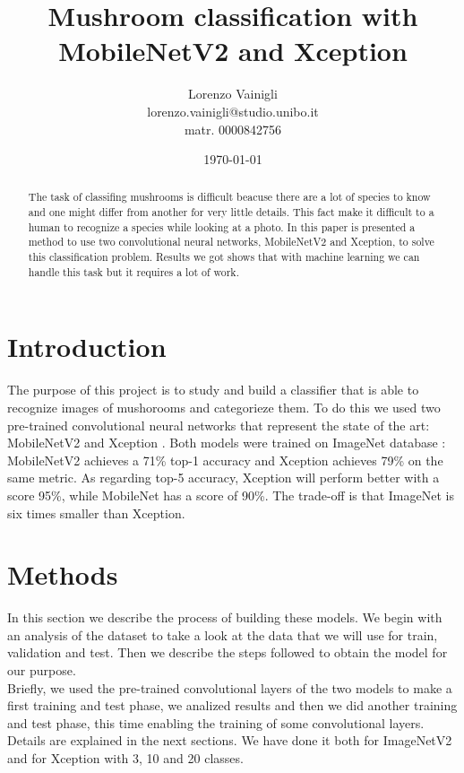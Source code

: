 \documentclass[12pt]{llncs}
\title{Mushroom classification with MobileNetV2 and Xception}
\author{Lorenzo Vainigli \\
lorenzo.vainigli@studio.unibo.it \\
matr. 0000842756}
\institute{Course of Machine Learning \\
Laurea Magistrale in Informatica \\
University of Bologna \\
A.Y. 2020-2021}
\date{\today}
\begin{document}
{\def\addcontentsline#1#2#3{}\maketitle}

\begin{abstract}
The task of classifing mushrooms is difficult beacuse there are a lot of species to know and one might differ from another for very little details. This fact make it difficult to a human to recognize a species while looking at a photo. In this paper is presented a method to use two convolutional neural networks, MobileNetV2 and Xception, to solve this classification problem. Results we got shows that with machine learning we can handle this task but it requires a lot of work.
\end{abstract}

\begingroup
\let\clearpage\relax
\renewcommand{\contentsname}{}
\setcounter{tocdepth}{2}
\tableofcontents
\endgroup

\section{Introduction}
The purpose of this project is to study and build a classifier that is able to recognize images of mushorooms and categorieze them. To do this we used two pre-trained convolutional neural networks that represent the state of the art: MobileNetV2 \cite{mobilenetv2} and Xception \cite{xception}. Both models were trained on ImageNet database \cite{imagenet}: MobileNetV2 achieves a 71\% top-1 accuracy and Xception achieves 79\% on the same metric. As regarding top-5 accuracy, Xception will perform better with a score 95\%, while MobileNet has a score of 90\%. The trade-off is that ImageNet is six times smaller than Xception.

\section{Methods}
In this section we describe the process of building these models. We begin with an analysis of the dataset to take a look at the data that we will use for train, validation and test. Then we describe the steps followed to obtain the model for our purpose. \\
Briefly, we used the pre-trained convolutional layers of the two models to make a first training and test phase, we analized results and then we did another training and test phase, this time enabling the training of some convolutional layers. Details are explained in the next sections. We have done it both for ImageNetV2 and for Xception with 3, 10 and 20 classes.
\end{document}

